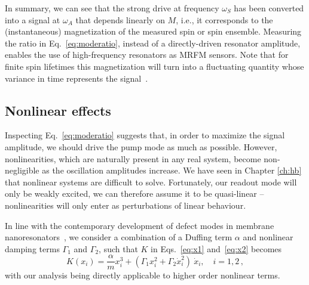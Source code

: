 In summary, we can see that the strong drive at frequency $\omega_S$ has been converted into a signal at $\omega_A$ that depends linearly on $M$, i.e., it corresponds to the (instantaneous) magnetization of the measured spin or spin ensemble. Measuring the ratio in Eq.~\eqref{eq:moderatio}, instead of a directly-driven resonator amplitude, enables the use of high-frequency resonators as MRFM sensors. Note that for finite spin lifetimes this magnetization will turn into a fluctuating quantity whose variance in time represents the signal~\cite{Grob_2019}.

\subsection{Nonlinear effects} \label{sec:nl}
Inspecting Eq.~\eqref{eq:moderatio} suggests that, in order to maximize the signal amplitude, we should drive the pump mode as much as possible. However, nonlinearities, which are naturally present in any real system, become non-negligible as the oscillation amplitudes increase. We have seen in Chapter \ref{ch:hb} that nonlinear systems are difficult to solve. Fortunately, our readout mode will only be weakly excited, we can therefore assume it to be {quasi-linear} -- nonlinearities will only enter as perturbations of linear behaviour.  

In line with the contemporary development of defect modes in membrane nanoresonators~\cite{Catalini_2020}, we consider a combination of a Duffing term $\alpha$ and nonlinear damping terms $\Gamma_1$ and $\Gamma_2$, such that $K$ in Eqs.~\eqref{eq:x1} and~\eqref{eq:x2} becomes
\begin{equation}
K(x_i) = \frac{\alpha}{m} x_i^3 + (\Gamma_1 x_i^2 + \Gamma_2 \dot{x}_i^2)\: \dot{x}_i, \quad i = 1,2 \,,
\end{equation}
with our analysis being directly applicable to higher order nonlinear terms. 

